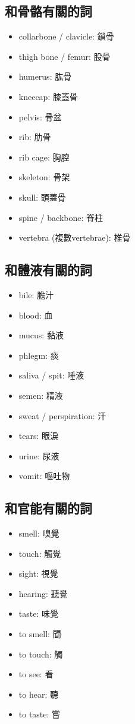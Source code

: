 \subsection{和骨骼有關的詞}
\begin{multicols}{3}
\begin{itemize}
  \itemsep0em
  \item collarbone / clavicle: 鎖骨
  \item thigh bone / femur: 股骨
  \item humerus: 肱骨
  \item kneecap: 膝蓋骨
  \item pelvis: 骨盆
  \item rib: 肋骨
  \item rib cage: 胸腔
  \item skeleton: 骨架
  \item skull: 頭蓋骨
  \item spine / backbone: 脊柱
  \item vertebra (複數vertebrae): 椎骨
\end{itemize}
\end{multicols}

\subsection{和體液有關的詞}
\begin{multicols}{3}
\begin{itemize}
  \itemsep0em
  \item bile: 膽汁
  \item blood: 血
  \item mucus: 黏液
  \item phlegm: 痰
  \item saliva / spit: 唾液
  \item semen: 精液
  \item sweat / perspiration: 汗
  \item tears: 眼淚
  \item urine: 尿液
  \item vomit: 嘔吐物
\end{itemize}
\end{multicols}

\subsection{和官能有關的詞}
\begin{multicols}{3}
\begin{itemize}
  \itemsep0em
  \item smell: 嗅覺
  \item touch: 觸覺
  \item sight: 視覺
  \item hearing: 聽覺
  \item taste: 味覺
  \item to smell: 聞
  \item to touch: 觸
  \item to see: 看
  \item to hear: 聽
  \item to taste: 嘗
\end{itemize}
\end{multicols}

